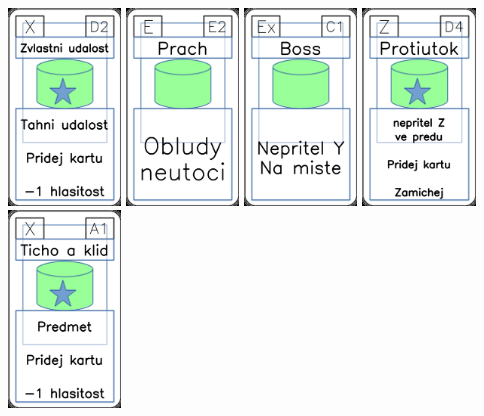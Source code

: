 \documentclass[a4paper]{article}
\begin{document}
	\includegraphics[width=3.0cm]{img-5_16}
	\includegraphics[width=3.0cm]{img-4_51}
	\includegraphics[width=3.0cm]{img-4_10}
	\includegraphics[width=3.0cm]{img-5_48}
	\includegraphics[width=3.0cm]{img-5_0}
\end{document}
